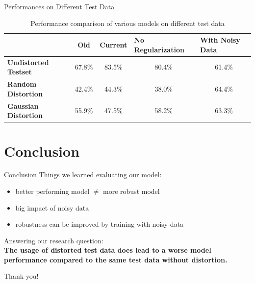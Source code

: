 \documentclass[aspectratio=169]{beamer}
\newcommand{\nologo}{\setbeamertemplate{logo}{}} %
\newcommand{\pop}[1]{{\color{niceorange}\textbf{#1}}}
\begin{document}
{	\begin{frame}{Performances on Different Test Data}
		\begin{table}[]
			\begin{tabular}{@{}lcccc@{}}
				\toprule
				& \textbf{Old} & \multicolumn{1}{l}{\textbf{Current}} & \multicolumn{1}{l}{\textbf{No Regularization}} & \multicolumn{1}{l}{\textbf{With Noisy Data}} \\ \midrule
				\textbf{Undistorted Testset}    & 67.8\%       & 83.5\%                               & 80.4\%                                         & 61.4\%                                       \\
				\textbf{Random Distortion}   & 42.4\%       & 44.3\%                               & 38.0\%                                         & 64.4\%                                       \\
				\textbf{Gaussian Distortion} & 55.9\%       & 47.5\%                               & 58.2\%                                         & 63.3\%                                       \\ \bottomrule
			\end{tabular}
			\caption{Performance comparison of various models on different test data}
			\label{tab:my-table}
		\end{table}
	\end{frame}

	\section{Conclusion}
		\begin{frame}{Conclusion}
		Things we learned evaluating our model:
		\begin{itemize}
			\item better performing model $\neq$ more robust model
			\item big impact of noisy data
			\item robustness can be improved by training with noisy data
		\end{itemize}
		\pause
		Answering our research question: \\
		\pop{The usage of distorted test data does lead to a worse model performance compared to the same test data without distortion.} 
		\end{frame}
}

\appendix
{\nologo
	\begin{frame}[standout]
		Thank you!
	\end{frame}
}
\end{document}
